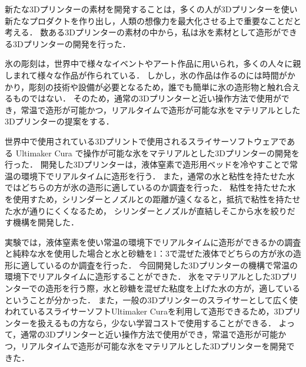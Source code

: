 新たな3Dプリンターの素材を開発することは，多くの人が3Dプリンターを使い新たなプロダクトを作り出し，人類の想像力を最大化させる上で重要なことだと考える．
数ある3Dプリンターの素材の中から，私は氷を素材として造形ができる3Dプリンターの開発を行った．

氷の彫刻は，世界中で様々なイベントやアート作品に用いられ，多くの人々に親しまれて様々な作品が作られている．
しかし，氷の作品は作るのには時間がかかり，彫刻の技術や設備が必要となるため，誰でも簡単に氷の造形物と触れ合えるものではない．
そのため，通常の3Dプリンターと近い操作方法で使用ができ，常温で造形が可能かつ，リアルタイムで造形が可能な氷をマテリアルとした3Dプリンターの提案をする．

世界中で使用されている3Dプリントで使用されるスライサーソフトウェアである Ultimaker Cura で操作が可能な氷をマテリアルとした3Dプリンターの開発を行った．
開発した3Dプリンターは，液体窒素で造形用ベッドを冷やすことで常温の環境下でリアルタイムに造形を行う．
また，通常の水と粘性を持たせた水ではどちらの方が氷の造形に適しているのか調査を行った．
粘性を持たせた水を使用すため，シリンダーとノズルとの距離が遠くなると，抵抗で粘性を持たせた水が通りにくくなるため，
シリンダーとノズルが直結しそこから水を絞りだす機構を開発した．

実験では，液体窒素を使い常温の環境下でリアルタイムに造形ができるかの調査と純粋な水を使用した場合と水と砂糖を1：3で混ぜた液体でどちらの方が氷の造形に適しているのか調査を行った．
今回開発した3Dプリンターの機構で常温の環境下でリアルタイムに造形することができた．
氷をマテリアルとした3Dプリンターでの造形を行う際，水と砂糖を混ぜた粘度を上げた水の方が，適しているということが分かった．
また，一般の3Dプリンターのスライサーとして広く使われているスライサーソフトUltimaker Curaを利用して造形できるため，3Dプリンターを扱えるもの方なら，少ない学習コストで使用することができる．
よって，通常の3Dプリンターと近い操作方法で使用ができ，常温で造形が可能かつ，リアルタイムで造形が可能な氷をマテリアルとした3Dプリンターを開発できた．
